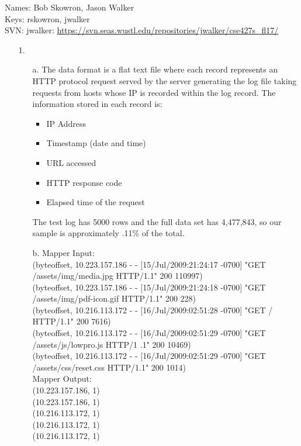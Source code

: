 \documentclass{article}
\begin{document}
\begin{flushleft}
Names: Bob Skowron, Jason Walker\\
Keys: rskowron, jwalker\\
SVN: jwalker: \url{https://svn.seas.wustl.edu/repositories/jwalker/cse427s_fl17/}\\
\end{flushleft}

\begin{itemize}
\item[1.] 
	\begin{itemize}
	\item[a.] The data format is a flat text file where each record represents an HTTP protocol request served by the server generating the log file taking requests from hosts whose IP is recorded within the log record. The information stored in each record is:\\
		\begin{itemize}
		\item IP Address
		\item Timestamp (date and time)
		\item URL accessed
		\item HTTP response code
		\item Elapsed time of the request
		\end{itemize}
	The test log has 5000 rows and the full data set has 4,477,843, so our sample is approximately .11\% of the total.	
	
	\item[b.] Mapper Input:\\
		(byteoffset, 10.223.157.186 - - [15/Jul/2009:21:24:17 -0700] "GET /assets/img/media.jpg HTTP/1.1" 200 110997)\\
		(byteoffset, 10.223.157.186 - - [15/Jul/2009:21:24:18 -0700] "GET /assets/img/pdf-icon.gif HTTP/1.1" 200 228)\\
		(byteoffset, 10.216.113.172 - - [16/Jul/2009:02:51:28 -0700] "GET / HTTP/1.1" 200 7616)\\
		(byteoffset, 10.216.113.172 - - [16/Jul/2009:02:51:29 -0700] "GET /assets/js/lowpro.js HTTP/1 .1" 200 10469)\\
		(byteoffset, 10.216.113.172 - - [16/Jul/2009:02:51:29 -0700] "GET /assets/css/reset.css HTTP/1.1" 200 1014)\\
		
	Mapper Output:\\
		(10.223.157.186, 1)\\
		(10.223.157.186, 1)\\
		(10.216.113.172, 1)\\
		(10.216.113.172, 1)\\
		(10.216.113.172, 1)\\


\end{itemize}
\end{itemize}
\end{document}
